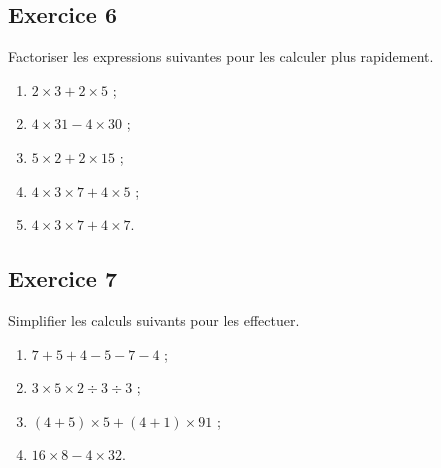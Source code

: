 \documentclass[12 pt]{extarticle}
\theoremstyle{plain}
\begin{document}
\subsection*{Exercice 6}

Factoriser les expressions suivantes pour les calculer plus rapidement. \begin{enumerate}
\item $ 2 \times 3 + 2 \times 5$ ;
\item $ 4 \times 31 - 4 \times 30 $ ;
\item $ 5 \times 2 + 2 \times 15$ ;
\item $ 4 \times 3 \times 7 + 4 \times 5$ ;
\item $ 4 \times 3 \times 7 + 4 \times 7$.
\end{enumerate}

\subsection*{Exercice 7}

Simplifier les calculs suivants pour les effectuer. \begin{enumerate}
\item $ 7 + 5 + 4 - 5 - 7 - 4$ ; 
\item $ 3 \times 5 \times 2 \div 3 \div 3$ ;
\item $ (4 + 5) \times 5 + (4+1) \times 91$ ;
\item $ 16 \times 8 - 4 \times 32$.
\end{enumerate}


 	
\end{document}
